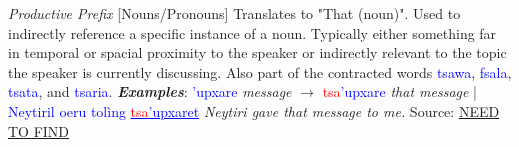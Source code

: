  \textit{Productive Prefix} [Nouns/Pronouns] Translates to "That (noun)".  Used to indirectly reference a specific instance of a noun.  Typically either something far in temporal or spacial proximity to the speaker or indirectly relevant to the topic the speaker is currently discussing.  Also part of the contracted words \textcolor{Blue}{tsawa}, \textcolor{Blue}{fsala}, \textcolor{Blue}{tsata}, and \textcolor{Blue}{tsaria}. \textit{\textbf{Examples}}: \textcolor{Blue}{'upxare}\textit{ message} $\rightarrow$ \textcolor{Red}{tsa}\textcolor{Blue}{'upxare}\textit{ that message} | \textcolor{Blue}{Neytiril oeru tolìng \underline{\textcolor{Red}{tsa}'upxaret}}\textit{ Neytiri gave that message to me.} Source: \hyperlink{naviteri.org}{NEED TO FIND}\par